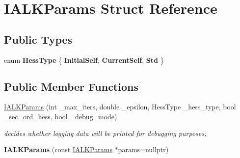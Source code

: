 \hypertarget{structIALKParams}{\section{I\-A\-L\-K\-Params Struct Reference}
\label{structIALKParams}
}
\subsection*{Public Types}
\begin{DoxyCompactItemize}
\item 
enum {\bfseries Hess\-Type} \{ {\bfseries Initial\-Self}, 
{\bfseries Current\-Self}, 
{\bfseries Std}
 \}
\end{DoxyCompactItemize}
\subsection*{Public Member Functions}
\begin{DoxyCompactItemize}
\item 
\hyperlink{structIALKParams_a355ce721a1366121d3762bf82e7dd3b2}{I\-A\-L\-K\-Params} (int \-\_\-max\-\_\-iters, double \-\_\-epsilon, Hess\-Type \-\_\-hess\-\_\-type, bool \-\_\-sec\-\_\-ord\-\_\-hess, bool \-\_\-debug\-\_\-mode)
\begin{DoxyCompactList}\small\item\em decides whether logging data will be printed for debugging purposes; \end{DoxyCompactList}\item 
\hypertarget{structIALKParams_abc5c24da3c94dd247a4ef36252c9c590}{{\bfseries I\-A\-L\-K\-Params} (const \hyperlink{structIALKParams}{I\-A\-L\-K\-Params} $\ast$params=nullptr)}\label{structIALKParams_abc5c24da3c94dd247a4ef36252c9c590}

\end{DoxyCompactItemize}
